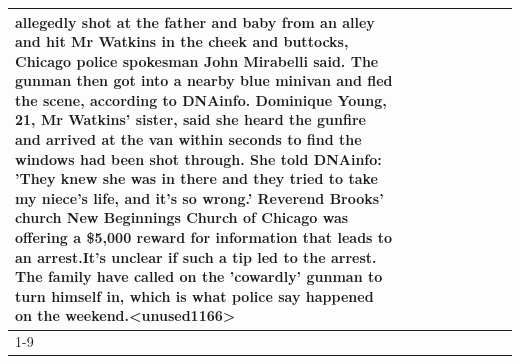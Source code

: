\begin{table}[H]
\begin{tabular}{lllrlllll}
allegedly shot at the father and baby from an alley and hit Mr Watkins in the cheek and buttocks, Chicago police spokesman John Mirabelli said. The gunman then got into a nearby blue minivan and fled the scene, according to DNAinfo. Dominique Young, 21, Mr Watkins' sister, said she heard the gunfire and arrived at the van within seconds to find the windows had been shot through. She told DNAinfo: 'They knew she was in there and they tried to take my niece's life, and it's so wrong.' Reverend Brooks' church New Beginnings Church of Chicago was offering a \$5,000 reward for information that leads to an arrest.It's unclear if such a tip led to the arrest. The family have called on the 'cowardly' gunman to turn himself in, which is what police say happened on the weekend.<unused1166> \\
\cline{1-9}
\bottomrule
\end{tabular}
\end{table}

